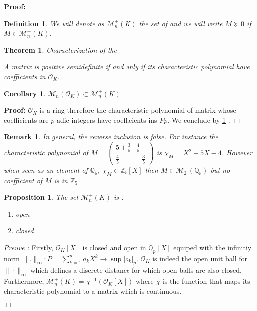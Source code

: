 \documentclass[a4paper,12pt]{article}
\newenvironment{proof}{\hbox{}\vspace{-0.5cm} {\bf Proof:}}{\hfill $\Box$ \\}
\newtheorem{theorem}{Theorem}
\newtheorem{proposition}{Proposition}
\newtheorem{corollary}{Corollary}
\newtheorem{definition}{Definition}
\newtheorem{remark}{Remark}
\newcommand{\OK}{\mathcal{O}_K}
\begin{document}
\begin{proof}
\begin{definition}
	We will denote as $ \mathcal{M}_n^+\left( K \right)$ the set of \mats and we will write $M \succeq 0$ if $M \in \mathcal{M}_n^+\left( K\right) $.
\end{definition}
\begin{theorem}
	\label{caracsdp}
	Characterization of the \mats
	
	A matrix is positive semidefinite if and only if its characteristic polynomial have coefficients in $\OK$.
	
\end{theorem}


\begin{corollary}
	$\mathcal{M}_n(\OK) \subset \mathcal{M}_n^+\left( K \right)$ 
\end{corollary}

\begin{proof}
$\OK$ is a ring therefore the characteristic polynomial of matrix whose coefficients are $p$-adic integers have coefficients ins $Pp$. We conclude by \ref{caracsdp} .
\end{proof}



\begin{remark}
	In general, the reverse inclusion is false. For instance the characteristic polynomial of $M = \begin{pmatrix} 5 + \frac{3}{5} & \frac{4}{5} \\ \frac{4}{5} & -\frac{3}{5} \end{pmatrix} $ is $\chi_M = X^2  - 5 X - 4$. However when seen as an element of $\mathbb{Q}_5$, $\chi_M \in \mathbb{Z}_5[X]$ then $M \in \mathcal{M}_2^+\left( \mathbb{Q}_5 \right)$ but no coefficient of $M$ is in $\mathbb{Z}_5 $
\end{remark}

\begin{proposition}
	The set $\mathcal{M}_n^+\left( K \right)$ is :
	\begin{enumerate}%
		\item open
		\item closed
	\end{enumerate}
\end{proposition}

\textit{Preuve :}  
Firstly, $\OK[X]$ is closed and open in $\mathbb{Q}_{ p }[X] $ equiped with the infinitiy norm $\|.\|_\infty : P = \sum_{k=1}^{n} a_k X^k \to \sup |a_k|_p$. $\OK$ is indeed the open unit ball for $\|\cdot \|_\infty$ which defines a discrete distance for which open balls are also closed.
Furthermore, $\mathcal{M}^+_{n}\left(K \right)  = \chi^{-1}( \OK[X]) $ where $\chi$ is the function that maps its characteristic polynomial to a matrix which is continuous.


\end{proof}
\end{document}

